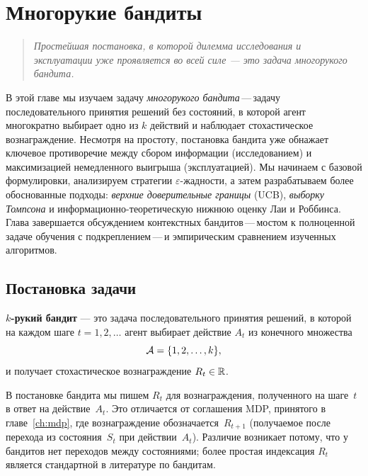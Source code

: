 \chapter{Многорукие бандиты}
\label{ch:bandits}

\begin{quote}
\itshape
Простейшая постановка, в которой дилемма исследования и эксплуатации уже проявляется во всей силе — это задача многорукого бандита.
\end{quote}

\bigskip

В этой главе мы изучаем задачу \emph{многорукого бандита}\,---\,задачу последовательного принятия решений без состояний, в которой агент многократно выбирает одно из $k$ действий и наблюдает стохастическое вознаграждение.  Несмотря на простоту, постановка бандита уже обнажает ключевое противоречие между сбором информации (исследованием) и максимизацией немедленного выигрыша (эксплуатацией).  Мы начинаем с базовой формулировки, анализируем стратегии $\varepsilon$-жадности, а затем разрабатываем более обоснованные подходы: \emph{верхние доверительные границы} (UCB), \emph{выборку Томпсона} и информационно-теоретическую нижнюю оценку Лаи и Роббинса.  Глава завершается обсуждением контекстных бандитов\,---\,мостом к полноценной задаче обучения с подкреплением\,---\,и эмпирическим сравнением изученных алгоритмов.


\section{Постановка задачи}
\label{sec:bandit-formulation}

\begin{definition}
\label{def:k-armed-bandit}
\textbf{$k$-рукий бандит} — это задача последовательного принятия решений, в которой на каждом шаге $t=1,2,\dots$ агент выбирает действие $A_t$ из конечного множества
\[
\mathcal{A} = \{1,2,\dots,k\},
\]
и получает стохастическое вознаграждение $R_t\in\mathbb{R}$.
\end{definition}

\begin{remark}
В постановке бандита мы пишем $R_t$ для вознаграждения, полученного на шаге~$t$ в ответ на действие~$A_t$.  Это отличается от соглашения MDP, принятого в главе~\ref{ch:mdp}, где вознаграждение обозначается~$R_{t+1}$ (получаемое после перехода из состояния~$S_t$ при действии~$A_t$).  Различие возникает потому, что у бандитов нет переходов между состояниями; более простая индексация $R_t$ является стандартной в литературе по бандитам.
\end{remark}

